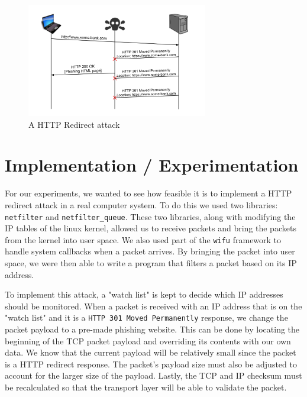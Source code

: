 \documentclass{article}
\begin{document}
\begin{figure}[t]
\begin{center}

\includegraphics[width=3.1in]{redirect_attack.png} 
\caption{A HTTP Redirect attack} 
\label{fg:attack}

\end{center}
\end{figure}

\section{Implementation / Experimentation}
For our experiments, we wanted to see how feasible it is to implement a HTTP redirect attack in a real computer system. To do this we used two libraries: \texttt{netfilter}\cite{netfilter} and \texttt{netfilter\_queue}\cite{netfilterQueue}. These two libraries, along with modifying the IP tables of the linux kernel, allowed us to receive packets and bring the packets from the kernel into user space. We also used part of the \texttt{wifu}\cite{wifu} framework to handle system callbacks when a packet arrives. By bringing the packet into user space, we were then able to write a program that filters a packet based on its IP address. 

To implement this attack, a "watch list" is kept to decide which IP addresses should be monitored. When a packet is received with an IP address that is on the "watch list" and it is a \texttt{HTTP 301 Moved Permanently} response, we change the packet payload to a pre-made phishing website. This can be done by locating the beginning of the TCP packet payload and overriding its contents with our own data. We know that the current payload will be relatively small since the packet is a HTTP redirect response. The packet's payload size must also be adjusted to account for the larger size of the payload. Lastly, the TCP and IP checksum must be recalculated so that the transport layer will be able to validate the packet.
\end{document}
